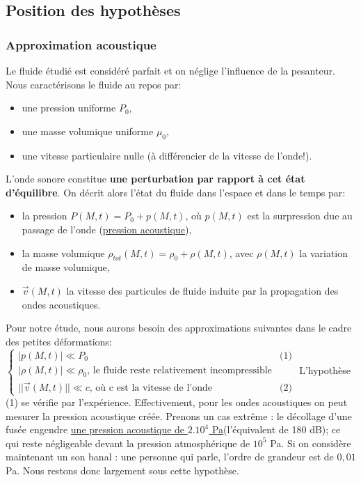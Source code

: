 \documentclass[a4paper, 12pt]{article}
\begin{document}
\subsection{Position des hypothèses}
\subsubsection{Approximation acoustique}
Le fluide étudié est considéré parfait et on néglige l'influence de la pesanteur.\newline
Nous caractérisons le fluide au repos par:
\begin{itemize}
\item une pression uniforme $P_0$,
\item une masse volumique uniforme $\mu_0$,
\item une vitesse particulaire nulle (à différencier de la vitesse de l'onde!).
\end{itemize}
L'onde sonore constitue \textbf{une perturbation par rapport à cet état d'équilibre}. On décrit alors l'état du fluide dans l'espace et dans le temps par:
\begin{itemize}
\item la pression $P(M,t)=P_0+p(M,t)$, où $p(M,t)$ est la surpression due au passage de l'onde (\underline{pression acoustique}),
\item la masse volumique $\rho_{tot}(M,t)=\rho_0+\rho(M,t)$, avec $\rho(M,t)$ la variation de masse volumique,
\item $\vec{v}(M,t)$ la vitesse des particules de fluide induite par la propagation des ondes acoustiques. \newline
\end{itemize}
Pour notre étude, nous aurons besoin des approximations suivantes dans le cadre des petites déformations:$\begin{cases}
|p(M,t)|\ll P_0 &\text{(1)}\\
|\rho(M,t)|\ll \rho_0 \text{, le fluide reste relativement incompressible} \\
||\vec{v}(M,t)||\ll c \text{, où c est la vitesse de l'onde} &\text{(2)}
\end{cases}$\newline \newline \newline
L'hypothèse (1) se vérifie par l'expérience. Effectivement, pour les ondes acoustiques on peut mesurer la pression acoustique créée. Prenons un cas extrême : le décollage d'une fusée engendre {\textcolor{blue}{\href{https://fr.wikipedia.org/wiki/Comparaison_du_volume_de_sources_courantes_de_bruit}{une pression acoustique de $2.10^4$ Pa}}}(l'équivalent de 180 dB); ce qui reste négligeable devant la pression atmosphérique de $10^5$ Pa. Si on considère maintenant un son banal : une personne qui parle, l'ordre de grandeur est de $0,01$ Pa. Nous restons donc largement sous cette hypothèse. \newline
\end{document}
